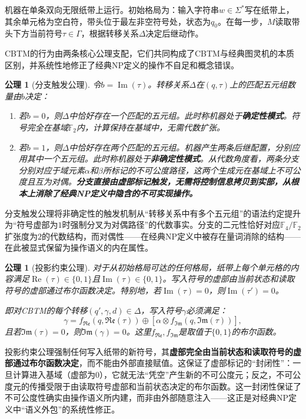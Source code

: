 \documentclass{ctexart}
\newtheorem{axiom}[theorem]{公理}
\begin{document}
	机器在单条双向无限纸带上运行。初始格局为：输入字符串$w \in \Sigma^*$写在纸带上，其余单元格为空白符，带头位于最左非空符号处，状态为$q_0$。在每一步，$M$读取带头下方当前符号$\tau \in \Gamma$，根据转移关系$\Delta$决定后继动作。
	
	CBTM的行为由两条核心公理支配，它们共同构成了CBTM与经典图灵机的本质区别，并系统性地修正了经典NP定义的操作不自足和概念错误。
	
	\begin{axiom}[分支触发公理]\label{ax:branching}
		令$b = \operatorname{Im}(\tau)$。转移关系$\Delta$在$(q, \tau)$上的匹配五元组数量由$b$决定：
		\begin{enumerate}
			\item 若$b = 0$，则$\Delta$中恰好存在一个匹配的五元组。此时称机器处于\textbf{确定性模式}。符号完全在基域$\mathbb{F}_2$内，计算保持在基域中，无需代数扩张。
			\item 若$b = 1$，则$\Delta$中恰好存在两个匹配的五元组。机器产生两条后继配置，分别应用其中一个五元组。此时称机器处于\textbf{非确定性模式}。从代数角度看，两条分支分别对应于域元素$\alpha$和$\beta$所标记的不可公度路径，这两个生成元在基域上不可公度且互为对偶。\textbf{分支直接由虚部标记触发，无需将控制信息拷贝到实部，从根本上消除了经典NP定义中隐含的不可实现操作。}
		\end{enumerate}
	\end{axiom}
	
	分支触发公理将非确定性的触发机制从``转移关系中有多个五元组''的语法约定提升为``符号虚部为$1$时强制分叉为对偶路径''的代数事实。分支的二元性恰好对应$\mathbb{F}_4/\mathbb{F}_2$扩张度为$2$的代数结构，而对偶性——在经典NP定义中被存在量词消除的结构——在此被显式保留为操作语义的内在属性。
	
	\begin{axiom}[投影约束公理]\label{ax:projection}
		对于从初始格局可达的任何格局，纸带上每个单元格的内容满足$\operatorname{Re}(\tau) \in \{0,1\}$且$\operatorname{Im}(\tau) \in \{0,1\}$。写入符号的虚部由当前状态和读取符号的虚部通过布尔函数决定。特别地，若$\operatorname{Im}(\tau) = 0$，则$\operatorname{Im}(\tau') = 0$。
		
		即对CBTM的每个转移$(q',\gamma,d) \in \Delta$，写入符号$\gamma$必须满足：
		\[
		\gamma = f_{\mathfrak{Re}}(q,\mathfrak{Re}(\tau)) \oplus [\alpha \otimes f_{\mathfrak{Im}}(q,\mathfrak{Im}(\tau))],
		\]
		且若$\mathfrak{Im}(\tau)=0$，则$\mathfrak{Im}(\gamma)=0$。这里$f_{\mathfrak{Re}},f_{\mathfrak{Im}}$是取值于$\{0,1\}$的布尔函数。
	\end{axiom}
	
	投影约束公理强制任何写入纸带的新符号，其\textbf{虚部完全由当前状态和读取符号的虚部通过布尔函数决定}，而不能由外部直接赋值。这保证了虚部标记的``封闭性''：一旦计算进入基域（虚部为$0$），它就无法``凭空''产生新的不可公度元；反之，不可公度元的传播受限于由读取符号虚部和当前状态决定的布尔函数。这一封闭性保证了不可公度性确实由操作语义所内建，而非由外部随意注入——这正是对经典NP定义中``语义外包''的系统性修正。
	
\end{document}
